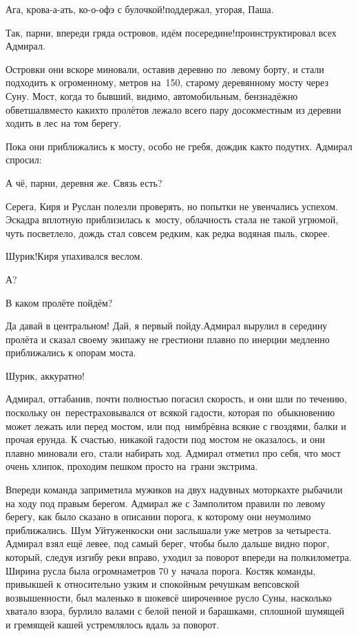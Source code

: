\diagdash Ага, крова-а-ать, ко-о-офэ с булочкой!\mdash поддержал, угорая, Паша.

\diagdash Так, парни, впереди гряда островов, идём посередине!\mdash проинструктировал всех Адмирал.

Островки они вскоре миновали, оставив деревню по~левому борту, и стали подходить к огроменному, метров на~150, старому деревянному мосту через Суну. Мост, когда то бывший, видимо, автомобильным, бензнадёжно обветшал\mdash вместо каких\sdash то пролётов лежало всего пару досок\mdash местным из деревни ходить в лес на том берегу.

Пока они приближались к мосту, особо не гребя, дождик как\sdash то подутих. Адмирал спросил:

\diagdash А чё, парни, деревня же. Связь есть?

Серега, Киря и Руслан полезли проверять, но попытки не увенчались успехом. Эскадра вплотную приблизилась к~мосту, облачность стала не такой угрюмой, чуть посветлело, дождь стал совсем редким, как редка водяная пыль, скорее. 

\diagdash Шурик!\mdash Киря упахивался веслом.

\diagdash А?

\diagdash В каком пролёте пойдём?

\diagdash Да давай в центральном! Дай, я первый пойду.\mdash Адмирал вырулил в середину пролёта и сказал своему экипажу не грести\mdash они плавно по инерции медленно приближались к опорам моста. 

\diagdash Шурик, аккуратно!

Адмирал, оттабанив, почти полностью погасил скорость, и они шли по течению, поскольку он~перестраховывался от всякой гадости, которая по~обыкновению может лежать или перед мостом, или под~ним\mdash брёвна всякие с гвоздями, балки и прочая ерунда. К счастью, никакой гадости под мостом не оказалось, и они плавно миновали его, стали набирать ход. Адмирал отметил про себя, что мост очень хлипок, проходим пешком просто на~грани экстрима.

Впереди команда заприметила мужиков на двух надувных моторках\mdash те рыбачили на ходу под правым берегом. Адмирал же с Замполитом правили по левому берегу, как было сказано в описании порога, к которому они неумолимо приближались. Шум Уйтуженкоски они заслышали уже метров за четыреста. Адмирал взял ещё левее, под самый берег, чтобы было дальше видно порог, который, следуя изгибу реки вправо, уходил за поворот впереди на полкилометра. Ширина русла была огромна\mdash метров 70 у~начала порога. Костяк команды, привыкшей к относительно узким и спокойным речушкам вепсовской возвышенности, был маленько в шоке\mdash всё широченное русло Суны, насколько хватало взора, бурлило валами с белой пеной и барашками, сплошной шумящей и гремящей кашей устремлялось вдаль за поворот.

